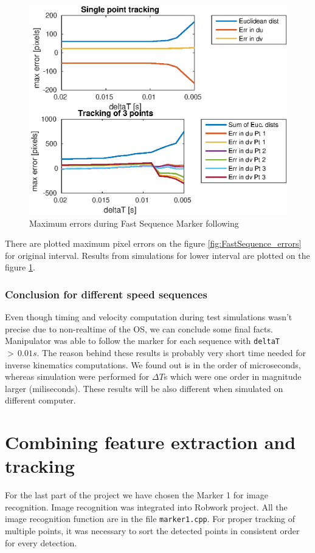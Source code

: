 \documentclass[]{scrartcl}
\begin{document}
\begin{figure}
	\centering
	\includegraphics[width=0.7\linewidth]{fig/FastSequence_low_dTs_errors.eps}
	\caption{Maximum errors during Fast Sequence Marker following}
	\label{fig:FastSequence_low_dTs_errors}
\end{figure}

There are plotted maximum pixel errors on the figure \ref{fig:FastSequence_errors} for original interval. Results from simulations for lower interval are plotted on the figure \ref{fig:FastSequence_low_dTs_errors}.

\subsubsection*{Conclusion for different speed sequences}
Even though timing and velocity computation during test simulations wasn't precise due to non-realtime of the OS, we can conclude some final facts. 
Manipulator was able to follow the marker for each sequence with \texttt{deltaT} $ >\, 0.01 s$. The reason behind these results is probably very short time needed for inverse kinematics computations. We found out is in the order of microseconds, whereas simulation were performed for $\Delta T$s which were one order in magnitude larger (miliseconds). These results will be also different when simulated on different computer.

\section{Combining feature extraction and tracking} 
For the last part of the project we have chosen the Marker 1 for image recognition. Image recognition was integrated into Robwork project. All the image recognition function are in the file \texttt{marker1.cpp}. For proper tracking of multiple points, it was necessary to sort the detected points in consistent order for every detection.
\end{document}
